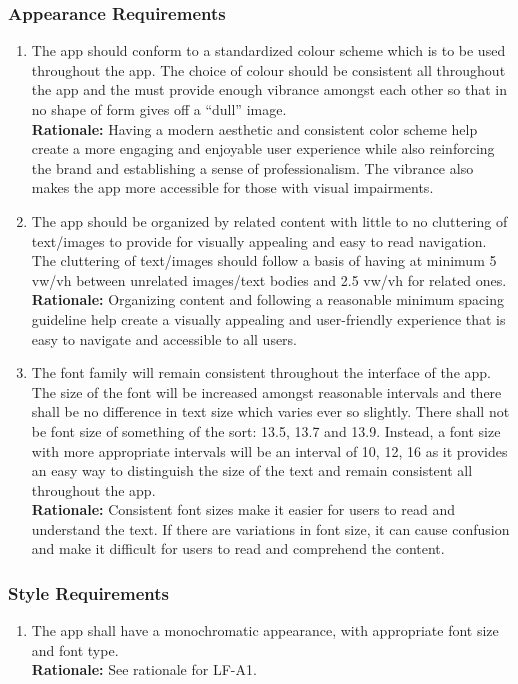 \documentclass[]{article}
\begin{document}
\subsubsection{Appearance Requirements}
\label{ssub:appearance_requirements}
\begin{enumerate}[{LF-A}1. ]
	\item The app should conform to a standardized colour scheme which is to be used throughout the app. The choice of colour should be consistent all throughout the app and the must provide enough vibrance amongst each other so that in no shape of form gives off a “dull” image.\\
	{\bf Rationale:} Having a modern aesthetic and consistent color scheme help create a more engaging and enjoyable user experience while also reinforcing the brand and establishing a sense of professionalism. The vibrance also makes the app more accessible for those with visual impairments.
	\item The app should be organized by related content with little to no cluttering of text/images to provide for visually appealing and easy to read navigation. The cluttering of text/images should follow a basis of having at minimum 5 vw/vh between unrelated images/text bodies and 2.5 vw/vh for related ones.\\
	{\bf Rationale:} Organizing content and following a reasonable minimum spacing guideline help create a visually appealing and user-friendly experience that is easy to navigate and accessible to all users.
	\item The font family will remain consistent throughout the interface of the app. The size of the font will be increased amongst reasonable intervals and there shall be no difference in text size which varies ever so slightly.  There shall not be font size of something of the sort: 13.5, 13.7 and 13.9. Instead, a font size with more appropriate intervals will be an interval of 10, 12, 16 as it provides an easy way to distinguish the size of the text and remain consistent all throughout the app.\\
	{\bf Rationale:} Consistent font sizes make it easier for users to read and understand the text. If there are variations in font size, it can cause confusion and make it difficult for users to read and comprehend the content. 
\end{enumerate}

\subsubsection{Style Requirements}
\label{ssub:style_requirements}
\begin{enumerate}[{LF-S}1. ]
	\item The app shall have a monochromatic appearance, with appropriate font size and font type.\\
	{\bf Rationale:} See rationale for LF-A1.
\end{enumerate}
\end{document}

